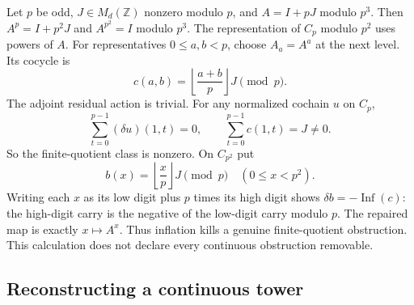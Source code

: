 \begin{example}\label{ex:inflation-carry}
Let $p$ be odd, $J\in M_d(\mathbb Z)$ nonzero modulo $p$, and $A=I+pJ$ modulo $p^3$. Then $A^p=I+p^2J$ and $A^{p^2}=I$ modulo $p^3$. The representation of $C_p$ modulo $p^2$ uses powers of $A$. For representatives $0\leq a,b<p$, choose $A_a=A^a$ at the next level. Its cocycle is
\[
 c(a,b)=\left\lfloor\frac{a+b}{p}\right\rfloor J\pmod p.
\]
The adjoint residual action is trivial. For any normalized cochain $u$ on $C_p$,
\[
 \sum_{t=0}^{p-1}(\delta u)(1,t)=0,
 \qquad\sum_{t=0}^{p-1}c(1,t)=J\ne0.
\]
So the finite-quotient class is nonzero. On $C_{p^2}$ put
\[
 b(x)=\left\lfloor\frac{x}{p}\right\rfloor J\pmod p
 \quad(0\leq x<p^2).
\]
Writing each $x$ as its low digit plus $p$ times its high digit shows
$\delta b=-\operatorname{Inf}(c)$: the high-digit carry is the negative of the low-digit carry modulo $p$. The repaired map is exactly $x\mapsto A^x$. Thus inflation kills a genuine finite-quotient obstruction. This calculation does not declare every continuous obstruction removable.
\end{example}

\subsection{Reconstructing a continuous tower}

